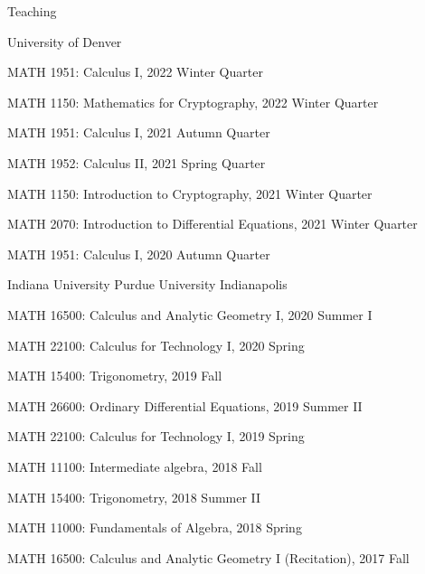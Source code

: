 \documentclass{resume} %
\begin{document}
\begin{rSection}{Teaching}
\begin{rSubsection}{University of Denver}{}
{}{}
  \item {MATH 1951: Calculus I, 2022 Winter Quarter}\\
  \item {MATH 1150: Mathematics for Cryptography, 2022 Winter Quarter}\\
  \item {MATH 1951: Calculus I, 2021 Autumn Quarter}\\
  \item {MATH 1952: Calculus II, 2021 Spring Quarter}\\
  \item {MATH 1150: Introduction to Cryptography, 2021 Winter Quarter}\\
  \item {MATH 2070: Introduction to Differential Equations, 2021 Winter Quarter}\\
  \item {MATH 1951: Calculus I, 2020 Autumn Quarter}\\
\end{rSubsection}

\begin{rSubsection}{Indiana University Purdue University Indianapolis}{}
{}{}
  \item {MATH 16500: Calculus and Analytic Geometry I, 2020 Summer I}\\
  \item {MATH 22100: Calculus for Technology I, 2020 Spring}\\
  \item {MATH 15400: Trigonometry, 2019 Fall}\\
  \item {MATH 26600: Ordinary Differential Equations, 2019 Summer II}\\
  \item {MATH 22100: Calculus for Technology I, 2019 Spring}\\
  \item {MATH 11100: Intermediate algebra, 2018 Fall}\\
  \item {MATH 15400: Trigonometry, 2018 Summer II}\\
  \item {MATH 11000: Fundamentals of Algebra, 2018 Spring}\\
  \item {MATH 16500: Calculus and Analytic Geometry I (Recitation), 2017 Fall}\\
\end{rSubsection}
\end{rSection}
\end{document}
